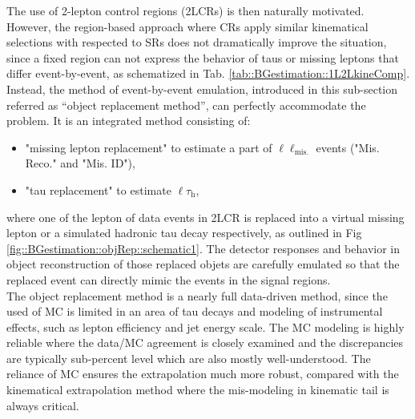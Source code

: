 The use of 2-lepton control regions (2LCRs) is then naturally motivated. However, the region-based approach where CRs apply similar kinematical selections with respected to SRs does not dramatically improve the situation, since a fixed region can not express the behavior of taus or missing leptons that differ event-by-event, as schematized in Tab. \ref{tab::BGestimation::1L2LkineComp}. \\

Instead, the method of event-by-event emulation, introduced in this sub-section referred as ``object replacement method'', can perfectly accommodate the problem. 
It is an integrated method consisting of:
\begin{itemize}
\item "missing lepton replacement" to estimate a part of $\ell\ell_{\mathrm{mis.}}$ events ("Mis. Reco." and "Mis. ID"),
\item "tau replacement" to estimate $\ell\tau_{\mathrm{h}}$,
\end{itemize}
where one of the lepton of data events in 2LCR is replaced into a virtual missing lepton or a simulated hadronic tau decay respectively, as outlined in Fig \ref{fig::BGestimation::objRep::schematic1}. 
The detector responses and behavior in object reconstruction of those replaced objets are carefully emulated so that the replaced event can directly mimic the events in the signal regions.   \\


The object replacement method is a nearly full data-driven method, since the used of MC is limited in an area of tau decays and modeling of instrumental effects, such as lepton efficiency and jet energy scale.
The MC modeling is highly reliable where the data/MC agreement is closely examined and the discrepancies are typically sub-percent level which are also mostly well-understood. 
The reliance of MC ensures the extrapolation much more robust, compared with the kinematical extrapolation method where the mis-modeling in kinematic tail is always critical. \\


